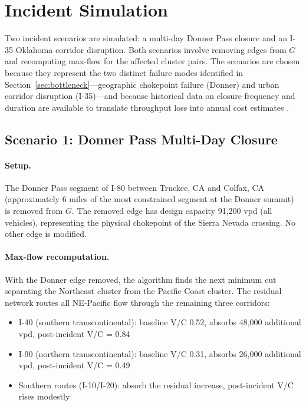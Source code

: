 \section{Incident Simulation}
\label{sec:incident}

Two incident scenarios are simulated: a multi-day Donner Pass closure and an I-35 Oklahoma corridor disruption. Both scenarios involve removing edges from $G$ and recomputing max-flow for the affected cluster pairs. The scenarios are chosen because they represent the two distinct failure modes identified in Section~\ref{sec:bottleneck}---geographic chokepoint failure (Donner) and urban corridor disruption (I-35)---and because historical data on closure frequency and duration are available to translate throughput loss into annual cost estimates \citep{ROUTE_C1}.

\subsection{Scenario 1: Donner Pass Multi-Day Closure}

\paragraph{Setup.} The Donner Pass segment of I-80 between Truckee, CA and Colfax, CA (approximately 6 miles of the most constrained segment at the Donner summit) is removed from $G$. The removed edge has design capacity 91,200 vpd (all vehicles), representing the physical chokepoint of the Sierra Nevada crossing. No other edge is modified.

\paragraph{Max-flow recomputation.} With the Donner edge removed, the algorithm finds the next minimum cut separating the Northeast cluster from the Pacific Coast cluster. The residual network routes all NE-Pacific flow through the remaining three corridors:
\begin{itemize}
  \item I-40 (southern transcontinental): baseline V/C 0.52, absorbs 48,000 additional vpd, post-incident V/C = 0.84
  \item I-90 (northern transcontinental): baseline V/C 0.31, absorbs 26,000 additional vpd, post-incident V/C = 0.49
  \item Southern routes (I-10/I-20): absorb the residual increase, post-incident V/C rises modestly
\end{itemize}

